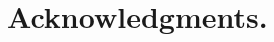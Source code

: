 \documentclass[moor]{informs1}              %
\let\loweredsection\section
\renewcommand{\section}[1]{\loweredsection{#1.}}
\begin{document}
\let\section\loweredsection
\section*{Acknowledgments.}



\end{document}
